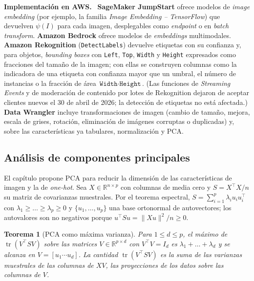 \documentclass[11pt,a4paper]{article}
\theoremstyle{plain}
\newtheorem{teorema}{Teorema}[section]
\theoremstyle{definition}
\theoremstyle{remark}
\newcommand{\R}{\mathbb{R}}
\newcommand{\tr}{\operatorname{tr}}
\newcommand{\1}{\mathbf{1}}
\newenvironment{aws}{\par\medskip\sloppy\noindent\textbf{Implementación en AWS.}\ }{\par\medskip}
\begin{document}
\begin{aws}
\textbf{SageMaker JumpStart} ofrece modelos de \emph{image embedding} (por
ejemplo, la familia \emph{Image Embedding -- TensorFlow}) que devuelven
$\psi(I)$ para cada imagen, desplegables como \emph{endpoint} o en
\emph{batch transform}. \textbf{Amazon Bedrock} ofrece modelos de
\emph{embeddings} multimodales. \textbf{Amazon Rekognition}
(\texttt{DetectLabels}) devuelve etiquetas con su confianza y, para
objetos, \emph{bounding boxes} con \texttt{Left}, \texttt{Top},
\texttt{Width} y \texttt{Height} expresados como fracciones del tamaño de
la imagen; con ellas se construyen columnas como la indicadora de una
etiqueta con confianza mayor que un umbral, el número de instancias o la
fracción de área $\texttt{Width}\cdot\texttt{Height}$. (Las funciones de
\emph{Streaming Events} y de moderación de contenido por lotes de
Rekognition dejaron de aceptar clientes nuevos el 30 de abril de 2026; la
detección de etiquetas no está afectada.) \textbf{Data Wrangler} incluye
transformaciones de imagen (cambio de tamaño, mejora, escala de grises,
rotación, eliminación de imágenes corruptas o duplicadas) y, sobre las
características ya tabulares, normalización y PCA.
\end{aws}

\subsection{Análisis de componentes principales}\label{sec:pca}

El capítulo propone PCA para reducir la dimensión de las características
de imagen y la de \emph{one-hot}. Sea $X\in\R^{n\times p}$ con columnas de
media cero y $S=X^\top X/n$ su matriz de covarianzas muestrales. Por el
teorema espectral, $S=\sum_{i=1}^p\lambda_iu_iu_i^\top$ con
$\lambda_1\ge\dots\ge\lambda_p\ge0$ y $\{u_1,\dots,u_p\}$ una base
ortonormal de autovectores; los autovalores son no negativos porque
$u^\top Su=\|Xu\|^2/n\ge0$.

\begin{teorema}[PCA como máxima varianza]\label{teo:pca}
Para $1\le d\le p$, el máximo de $\tr(V^\top SV)$ sobre las matrices
$V\in\R^{p\times d}$ con $V^\top V=I_d$ es $\lambda_1+\dots+\lambda_d$ y
se alcanza en $V=[u_1\cdots u_d]$. La cantidad $\tr(V^\top SV)$ es la suma
de las varianzas muestrales de las columnas de $XV$, las proyecciones de
los datos sobre las columnas de $V$.
\end{teorema}
\end{document}
